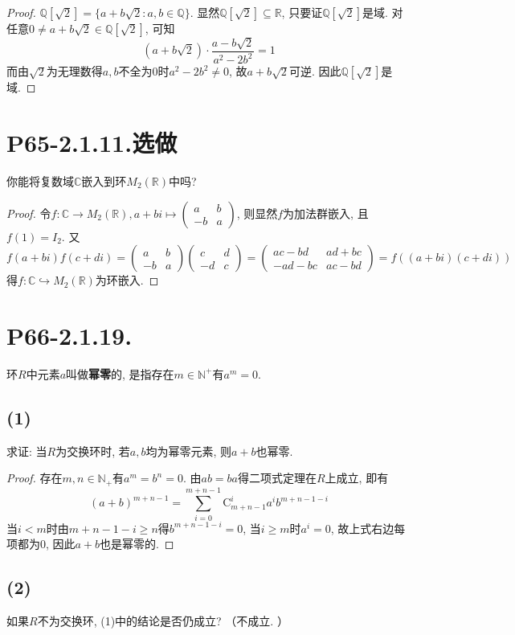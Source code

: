 \documentclass[12pt, a4paper, fontset=windows]{ctexart}
\newcommand{\C}{\mathbb{C}}
\newcommand{\N}{\mathbb{N}}
\newcommand{\Q}{\mathbb{Q}}
\newcommand{\R}{\mathbb{R}}
\newcommand{\kh}[1]{（{#1}）} %
\newcommand{\xuan}{{\normalsize 选做}}
\def\pmat#1{\begin{pmatrix}#1\end{pmatrix}}
\begin{document}
\begin{proof}
$\Q[\sqrt{2}]=\{a+b\sqrt{2}:a,b\in\Q\}$. 
显然$\Q[\sqrt{2}]\subseteq\R$, 只要证$\Q[\sqrt{2}]$是域. 
对任意$0\ne a+b\sqrt{2}\in\Q[\sqrt{2}]$, 可知
\[(a+b\sqrt{2})\cdot\frac{a-b\sqrt{2}}{a^2-2b^2}=1\]
而由$\sqrt{2}$为无理数得$a,b$不全为$0$时$a^2-2b^2\ne 0$, 
故$a+b\sqrt{2}$可逆. 因此$\Q[\sqrt{2}]$是域. 
\end{proof}

\section*{P65-2.1.11.\xuan}

你能将复数域$\C$嵌入到环$M_2(\R)$中吗?

\begin{proof}
令$f:\C\to M_2(\R),a+bi\mapsto\pmat{a&b\\-b&a}$, 
则显然$f$为加法群嵌入, 且$f(1)=I_2$. 又
\[f(a+bi)f(c+di)=\pmat{a&b\\-b&a}\pmat{c&d\\-d&c}=\pmat{ac-bd&ad+bc\\-ad-bc&ac-bd}=f((a+bi)(c+di))\]
得$f:\C\hookrightarrow M_2(\R)$为环嵌入. 
\end{proof}

\section*{P66-2.1.19.}
\label{nilpotent}

环$R$中元素$a$叫做{\bf 幂零}的, 是指存在$m\in\N^+$有$a^m=0$. 

\subsection*{(1)}

求证: 当$R$为交换环时, 若$a,b$均为幂零元素, 则$a+b$也幂零. 

\begin{proof}
存在$m,n\in\N_+$有$a^m=b^n=0$. 由$ab=ba$得二项式定理在$R$上成立, 即有
\[(a+b)^{m+n-1}=\sum^{m+n-1}_{i=0}\text{C}^i_{m+n-1}a^ib^{m+n-1-i}\]
当$i<m$时由$m+n-1-i\ge n$得$b^{m+n-1-i}=0$, 当$i\ge m$时$a^i=0$, 
故上式右边每项都为$0$, 因此$a+b$也是幂零的. 
\end{proof}

\subsection*{(2)}

如果$R$不为交换环, (1)中的结论是否仍成立? \kh{不成立. }
\end{document}
